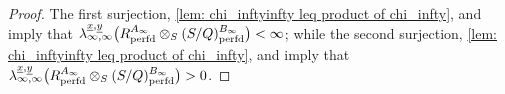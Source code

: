 \documentclass[12pt]{amsart}
\numberwithin{equation}{theorem}
\numberwithin{equation}{theorem}
\renewcommand{\m}{\mathfrak{m}}
\newcommand{\perfd}{\textnormal{perfd}}
\begin{document}
\begin{proof}
The first surjection, \autoref{lem: chi_inftyinfty leq product of chi_infty}, and \cite[Corollary 4.0.18]{CaiLeeMaSchwedeTuckerPerfdSignature2026} imply that $\lambda_{\infty, \infty}^{\underline{x}, \underline{y}}\big(R^{A_\infty}_\perfd\otimes_S(S/Q)^{B_\infty}_\perfd\big)<\infty$; while the second surjection, \autoref{lem: chi_inftyinfty leq product of chi_infty}, and \cite[Proposition 4.0.20]{CaiLeeMaSchwedeTuckerPerfdSignature2026} imply that $\lambda_{\infty, \infty}^{\underline{x}, \underline{y}}\big(R^{A_\infty}_\perfd\otimes_S(S/Q)^{B_\infty}_\perfd\big)>0$.
\end{proof}

\end{document}
